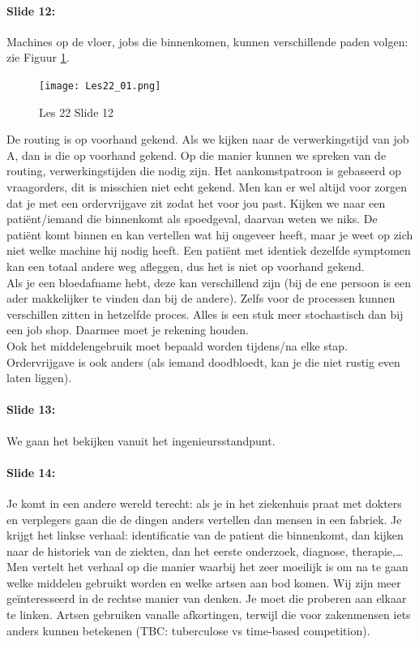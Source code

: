 \documentclass[10pt,a4paper]{report}
\begin{document}
\paragraph{Slide 12:} Machines op de vloer, jobs die binnenkomen, kunnen verschillende paden volgen: zie Figuur \ref{les22_01}.\\

\begin{figure}[h!]
\centering
\texttt{[image: Les22\_01.png]}
\caption{Les 22 Slide 12} 
\label{les22_01}
\end{figure}

De routing is op voorhand gekend. Als we kijken naar de verwerkingstijd van job A, dan is die op voorhand gekend. Op die manier kunnen we spreken van de routing, verwerkingstijden die nodig zijn. Het aankomstpatroon is gebaseerd op vraagorders, dit is misschien niet echt gekend. Men kan er wel altijd voor zorgen dat je met een ordervrijgave zit zodat het voor jou past. Kijken we naar een pati\"ent/iemand die binnenkomt als spoedgeval, daarvan weten we niks. De pati\"ent komt binnen en kan vertellen wat hij ongeveer heeft, maar je weet op zich niet welke machine hij nodig heeft. Een pati\"ent met identiek dezelfde symptomen kan een totaal andere weg afleggen, dus het is niet op voorhand gekend.\\
Als je een bloedafname hebt, deze kan verschillend zijn (bij de ene persoon is een ader makkelijker te vinden dan bij de andere). Zelfs voor de processen kunnen verschillen zitten in hetzelfde proces. Alles is een stuk meer stochastisch dan bij een job shop. Daarmee moet je rekening houden.\\
Ook het middelengebruik moet bepaald worden tijdens/na elke stap. \\
Ordervrijgave is ook anders (als iemand doodbloedt, kan je die niet rustig even laten liggen).

\paragraph{Slide 13:} We gaan het bekijken vanuit het ingenieursstandpunt.

\paragraph{Slide 14:} Je komt in een andere wereld terecht: als je in het ziekenhuis praat met dokters en verplegers gaan die de dingen anders vertellen dan mensen in een fabriek. Je krijgt het linkse verhaal: identificatie van de patient die binnenkomt, dan kijken naar de historiek van de ziekten, dan het eerste onderzoek, diagnose, therapie,… Men vertelt het verhaal op die manier waarbij het zeer moeilijk is om na te gaan welke middelen gebruikt worden en welke artsen aan bod komen. Wij zijn meer ge\"interesseerd in de rechtse manier van denken. Je moet die proberen aan elkaar te linken. Artsen gebruiken vanalle afkortingen, terwijl die voor zakenmensen iets anders kunnen betekenen (TBC: tuberculose vs time-based competition).
\end{document}
